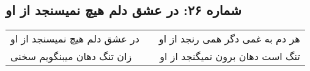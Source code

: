 \begin{center}
\section*{شماره ۲۶: در عشق دلم هیچ نمیسنجد از او}
\label{sec:026}
\begin{longtable}{l p{0.5cm} r}
در عشق دلم هیچ نمیسنجد از او
&&
هر دم به غمی دگر همی رنجد از او
\\
زان تنگ دهان میبنگویم سخنی
&&
تنگ است دهان برون نمیگنجد از او
\\
\end{longtable}
\end{center}
